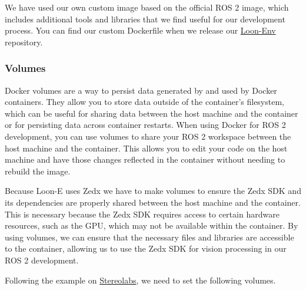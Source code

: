 We have used our own custom image based on the official ROS 2 image, which includes additional tools and libraries that we find useful for our development process. You can find our custom Dockerfile when we release our \href{https://github.com/HumberASV/Loon-Env}{Loon-Env} repository.


\subsubsection{Volumes}

Docker volumes are a way to persist data generated by and used by Docker containers. They allow you to store data outside of the container's filesystem, which can be useful for sharing data between the host machine and the container or for persisting data across container restarts. When using Docker for ROS 2 development, you can use volumes to share your ROS 2 workspace between the host machine and the container. This allows you to edit your code on the host machine and have those changes reflected in the container without needing to rebuild the image.

Because Loon-E uses Zedx we have to make volumes to ensure the Zedx SDK and its dependencies are properly shared between the host machine and the container. This is necessary because the Zedx SDK requires access to certain hardware resources, such as the GPU, which may not be available within the container. By using volumes, we can ensure that the necessary files and libraries are accessible to the container, allowing us to use the Zedx SDK for vision processing in our ROS 2 development.

Following the example on \href{https://www.stereolabs.com/docs/cameras/zed-x/zed-x-and-docker}{Stereolabs}, we need to set the following volumes.

